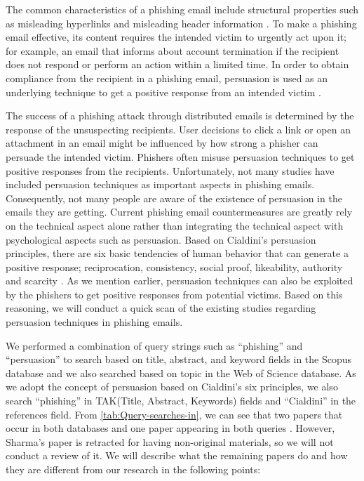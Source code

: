 The common characteristics of a phishing email include structural
properties such as misleading hyperlinks and misleading header information
\citep{zhang:2006,zhang:2007}. To make a phishing email effective,
its content requires the intended victim to urgently act upon it;
for example, an email that informs about account termination if the
recipient does not respond or perform an action within a limited time.
In order to obtain compliance from the recipient in a phishing email,
persuasion is used as an underlying technique to get a positive response
from an intended victim \citep{workman:2008}.

The success of a phishing attack through distributed emails is determined
by the response of the unsuspecting recipients. User decisions to
click a link or open an attachment in an email might be influenced
by how strong a phisher can persuade the intended victim. Phishers
often misuse persuasion techniques to get positive responses from
the recipients. Unfortunately, not many studies have included persuasion
techniques as important aspects in phishing emails. Consequently,
not many people are aware of the existence of persuasion in the emails
they are getting. Current phishing email countermeasures are greatly
rely on the technical aspect alone rather than integrating the technical
aspect with psychological aspects such as persuasion. Based on Cialdini's
persuasion principles, there are six basic tendencies of human behavior
that can generate a positive response; reciprocation, consistency,
social proof, likeability, authority and scarcity \citep{cialdini:2001}.
As we mention earlier, persuasion techniques can also be exploited
by the phishers to get positive responses from potential victims.
Based on this reasoning, we will conduct a quick scan of the existing
studies regarding persuasion techniques in phishing emails.

We performed a combination of query strings such as ``phishing''
and ``persuasion'' to search based on title, abstract, and keyword
fields in the Scopus database and we also searched based on topic
in the Web of Science database. As we adopt the concept of persuasion
based on Cialdini's six principles, we also search ``phishing''
in TAK(Title, Abstract, Keywords) fields and ``Cialdini'' in the
references field. From \autoref{tab:Query-searches-in}, we can see
that two papers that occur in both databases \citep{wright2014research,kaivanto2014effect}
and one paper appearing in both queries \citep{wright2014research}.
However, Sharma's paper is retracted for having non-original materials,
so we will not conduct a review of it. We will describe what the remaining
papers do and how they are different from our research in the following
points:

